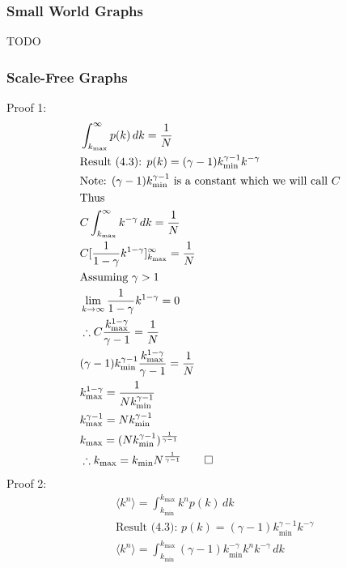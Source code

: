 \documentclass{article}
\begin{document}
            \subsubsection{Small World Graphs}
            TODO
            \subsubsection{Scale-Free Graphs}
            Proof 1:
            \begin{align*}
                &\int_{k_{\text{max}}}^{\infty} p(k) \,dk = \frac{1}{N}\\
                &\text{Result (4.3): } p(k) = (\gamma -1)k^{\gamma-1}_{\text{min}}k^{-\gamma}\\
                &\text{Note: $(\gamma -1)k^{\gamma-1}_{\text{min}}$ is a constant which we will call $C$}\\
                &\text{Thus}\\
                &C\int_{k_{\text{max}}}^{\infty}k^{-\gamma} \,dk  = \frac{1}{N}\\
                &C[\frac{1}{1-\gamma}k^{1-\gamma}]^{\infty}_{k_{\text{max}}} = \frac{1}{N}\\
                &\text{Assuming $\gamma>1$}\\
                &\lim_{k \to \infty} \frac{1}{1-\gamma}k^{1-\gamma}= 0\\
                &\therefore C\frac{{k^{1-\gamma}_{\text{max}}}}{\gamma -1} = \frac{1}{N}\\
                &(\gamma-1)k^{\gamma-1}_{\text{min}}\frac{{k^{1-\gamma}_{\text{max}}}}{\gamma -1} = \frac{1}{N}\\
                &k^{1-\gamma}_{\text{max}} = \frac{1}{Nk^{\gamma-1}_{\text{min}}}\\
                &k^{\gamma -1}_{\text{max}} = Nk^{\gamma-1}_{\text{min}}\\
                &k_{\text{max}} = (Nk^{\gamma-1}_{\text{min}})^{\frac{1}{\gamma-1}}\\
                &\therefore k_{\text{max}} = k_{\text{min}}N^{\frac{1}{\gamma-1}} \qed
            \end{align*}
            Proof 2:
            \begin{align*}
                &\langle k^n \rangle = \int_{k_{\text{min}}}^{k_{\text{max}}}k^{n}p(k) \,dk\\
                &\text{Result (4.3): } p(k) = (\gamma -1)k^{\gamma-1}_{\text{min}}k^{-\gamma}\\
                &\langle k^n \rangle = \int_{k_{\text{min}}}^{k_{\text{max}}} (\gamma-1)k^{-\gamma}_{\text{min}}k^{n}k^{-\gamma} \,dk
            \end{align*}
\end{document}
